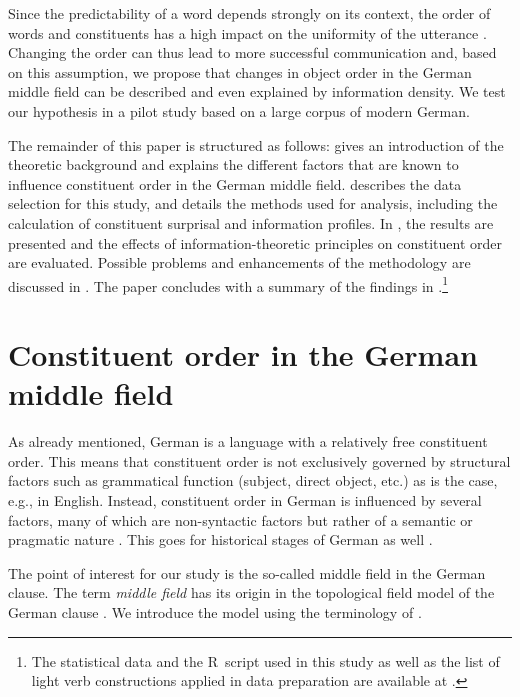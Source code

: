 \documentclass[output=paper,colorlinks,citecolor=brown]{langscibook}
\begin{document}
Since the predictability of a word depends strongly on its context, the order of words and constituents has a high impact on the uniformity of the utterance \citep{cuskley21}. Changing the order can thus lead to more successful communication and, based on this assumption, we propose that changes in object order in the German middle field can be described and even explained by information density. 
We test our hypothesis in a pilot study based on a large corpus of modern German.

The remainder of this paper is structured as follows:  gives an introduction of the theoretic background and explains the different factors that are known to influence constituent order in the German middle field.  describes the data selection for this study, and  details the methods used for analysis, including the calculation of constituent surprisal and information profiles. In , the results are presented and the effects of information-theoretic principles on constituent order are evaluated. Possible problems and enhancements of the methodology are discussed in . The paper concludes with a summary of the findings in .\footnote{The statistical data and the R~script used in this study as well as the list of light verb constructions applied in data preparation are available at \git.}

\section{Constituent order in the German middle field}\label{sec:order}
As already mentioned, German is a language with a relatively free constituent order. This means that constituent order is not exclusively governed by structural factors such as grammatical function (subject, direct object, etc.) as is the case, e.g., in English. Instead, constituent order in German is influenced by several factors, many of which are non-syntactic factors but rather of a semantic or pragmatic nature \citep[see, e.g.,][]{lenerz77,rauth20}. This goes for historical stages of German as well \citep[][]{speyer11, speyer13, rauth20}.

The point of interest for our study is the so-called middle field in the German clause. The term \textit{middle field} has its origin in the topological field model of the German clause \citep[for a recent overview, see, e.g.,][]{Woellstein.2010, Woellstein.2014}. 
We introduce the model using the terminology of \citet{telljohann-et-al17}.
\end{document}
